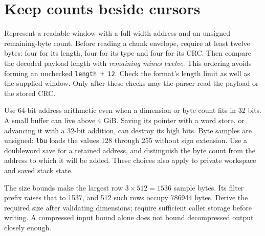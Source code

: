 \section{Keep counts beside cursors}
Represent a readable window with a full-width address and an unsigned remaining-byte
count. Before reading a chunk envelope, require at least twelve bytes: four for its
length, four for its type and four for its CRC. Then compare the decoded payload
length with \emph{remaining minus twelve}. This ordering avoids forming an unchecked
\texttt{length + 12}. Check the format's length limit as well as the supplied window.
Only after these checks may the parser read the payload or the stored CRC.

Use 64-bit address arithmetic even when a dimension or byte count fits in 32 bits.
A small buffer can live above 4 GiB. Saving its pointer with a word store, or advancing
it with a 32-bit addition, can destroy its high bits. Byte samples are unsigned:
\texttt{lbu} loads the values 128 through 255 without sign extension. Use a doubleword
save for a retained address, and distinguish the byte count from the address to which
it will be added. These choices also apply to private workspace and saved stack state.

The size bounds make the largest row $3\times512=1536$ sample bytes. Its filter prefix
raises that to 1537, and 512 such rows occupy 786944 bytes. Derive the required size
after validating dimensions; require sufficient caller storage before writing. A
compressed input bound alone does not bound decompressed output closely enough.
